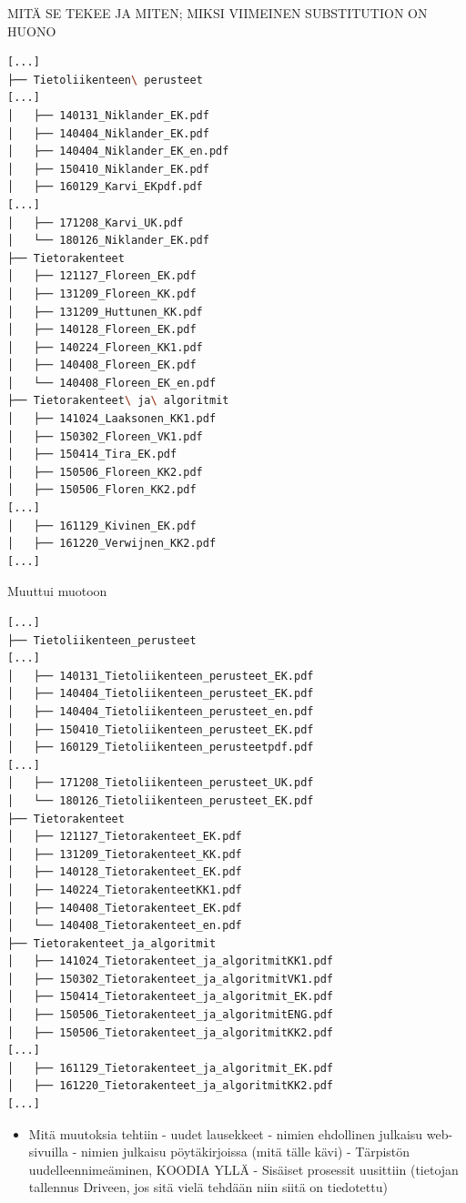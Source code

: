 \documentclass[finnish]{tktltiki}
\begin{document}
MITÄ SE TEKEE JA MITEN; MIKSI VIIMEINEN SUBSTITUTION ON HUONO

\begin{lstlisting}[language=BASH,style=tree]
[...]
├── Tietoliikenteen\ perusteet
[...]
│   ├── 140131_Niklander_EK.pdf
│   ├── 140404_Niklander_EK.pdf
│   ├── 140404_Niklander_EK_en.pdf
│   ├── 150410_Niklander_EK.pdf
│   ├── 160129_Karvi_EKpdf.pdf
[...]
│   ├── 171208_Karvi_UK.pdf
│   └── 180126_Niklander_EK.pdf
├── Tietorakenteet
│   ├── 121127_Floreen_EK.pdf
│   ├── 131209_Floreen_KK.pdf
│   ├── 131209_Huttunen_KK.pdf
│   ├── 140128_Floreen_EK.pdf
│   ├── 140224_Floreen_KK1.pdf
│   ├── 140408_Floreen_EK.pdf
│   └── 140408_Floreen_EK_en.pdf
├── Tietorakenteet\ ja\ algoritmit
│   ├── 141024_Laaksonen_KK1.pdf
│   ├── 150302_Floreen_VK1.pdf
│   ├── 150414_Tira_EK.pdf
│   ├── 150506_Floreen_KK2.pdf
│   ├── 150506_Floren_KK2.pdf
[...]
│   ├── 161129_Kivinen_EK.pdf
│   ├── 161220_Verwijnen_KK2.pdf
[...]
\end{lstlisting}

Muuttui muotoon

\begin{lstlisting}[language=BASH,style=tree]
[...]
├── Tietoliikenteen_perusteet
[...]
│   ├── 140131_Tietoliikenteen_perusteet_EK.pdf
│   ├── 140404_Tietoliikenteen_perusteet_EK.pdf
│   ├── 140404_Tietoliikenteen_perusteet_en.pdf
│   ├── 150410_Tietoliikenteen_perusteet_EK.pdf
│   ├── 160129_Tietoliikenteen_perusteetpdf.pdf
[...]
│   ├── 171208_Tietoliikenteen_perusteet_UK.pdf
│   └── 180126_Tietoliikenteen_perusteet_EK.pdf
├── Tietorakenteet
│   ├── 121127_Tietorakenteet_EK.pdf
│   ├── 131209_Tietorakenteet_KK.pdf
│   ├── 140128_Tietorakenteet_EK.pdf
│   ├── 140224_TietorakenteetKK1.pdf
│   ├── 140408_Tietorakenteet_EK.pdf
│   └── 140408_Tietorakenteet_en.pdf
├── Tietorakenteet_ja_algoritmit
│   ├── 141024_Tietorakenteet_ja_algoritmitKK1.pdf
│   ├── 150302_Tietorakenteet_ja_algoritmitVK1.pdf
│   ├── 150414_Tietorakenteet_ja_algoritmit_EK.pdf
│   ├── 150506_Tietorakenteet_ja_algoritmitENG.pdf
│   ├── 150506_Tietorakenteet_ja_algoritmitKK2.pdf
[...]
│   ├── 161129_Tietorakenteet_ja_algoritmit_EK.pdf
│   ├── 161220_Tietorakenteet_ja_algoritmitKK2.pdf
[...]
\end{lstlisting}
	
\begin{itemize}
\item Mitä muutoksia tehtiin
\subitem - uudet lausekkeet
\subitem - nimien ehdollinen julkaisu web-sivuilla
\subitem - nimien julkaisu pöytäkirjoissa (mitä tälle kävi)
\subitem - Tärpistön uudelleennimeäminen, KOODIA YLLÄ
\subitem - Sisäiset prosessit uusittiin (tietojan tallennus Driveen, jos sitä vielä tehdään niin siitä on tiedotettu)
\end{itemize}
\end{document}
